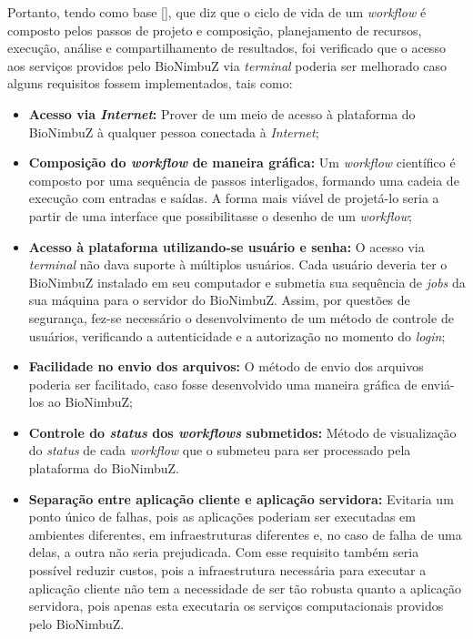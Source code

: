 Portanto, tendo como base [], que diz que o ciclo de vida de um \textit{workflow} é composto pelos passos de projeto e composição, planejamento de recursos, execução, análise e compartilhamento de resultados, foi verificado que o acesso aos serviços providos pelo BioNimbuZ via \textit{terminal} poderia ser melhorado caso alguns requisitos fossem implementados, tais como:

\begin{itemize}
	\item \textbf{Acesso via \textit{Internet}:} Prover de um meio de acesso à plataforma do BioNimbuZ à qualquer pessoa conectada à \textit{Internet};
    \item \textbf{Composição do \textit{workflow} de maneira gráfica:} Um \textit{workflow} científico é composto por uma sequência de passos interligados, formando uma cadeia de execução com entradas e saídas. A forma mais viável de projetá-lo seria a partir de uma interface que possibilitasse o desenho de um \textit{workflow};
	\item \textbf{Acesso à plataforma utilizando-se usuário e senha:} O acesso via \textit{terminal} não dava suporte à múltiplos usuários. Cada usuário deveria ter o BioNimbuZ instalado em seu computador e submetia sua sequência de \textit{jobs} da sua máquina para o servidor do BioNimbuZ. Assim, por questões de segurança, fez-se necessário o desenvolvimento de um método de controle de usuários, verificando a autenticidade e a autorização no momento do \textit{login};
    \item \textbf{Facilidade no envio dos arquivos:} O método de envio dos arquivos poderia ser facilitado, caso fosse desenvolvido uma maneira gráfica de enviá-los ao BioNimbuZ;
    \item \textbf{Controle do \textit{status} dos \textit{workflows} submetidos:} Método de visualização do \textit{status} de cada \textit{workflow} que o submeteu para ser processado pela plataforma do BioNimbuZ.
    \item \textbf{Separação entre aplicação cliente e aplicação servidora:} Evitaria um ponto único de falhas, pois as aplicações poderiam ser executadas em ambientes diferentes, em infraestruturas diferentes e, no caso de falha de uma delas, a outra não seria prejudicada. Com esse requisito também seria possível reduzir custos, pois a infraestrutura necessária para executar a aplicação cliente não tem a necessidade de ser tão robusta quanto a aplicação servidora, pois apenas esta executaria os serviços computacionais providos pelo BioNimbuZ.
\end{itemize}

